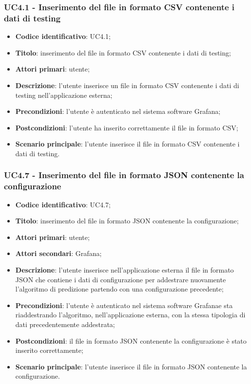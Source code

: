 \subsubsection{UC4.1 - Inserimento del file in formato CSV contenente i dati di testing}
\begin{itemize}
    \item \textbf{Codice identificativo}: UC4.1;
    \item \textbf{Titolo}: inserimento del file in formato CSV contenente i dati di testing;
    \item \textbf{Attori primari}: utente;
    \item \textbf{Descrizione}: l'utente inserisce un file in formato CSV contenente i dati di testing nell'applicazione esterna;
    \item \textbf{Precondizioni}: l'utente è autenticato nel sistema software Grafana\glo;
    \item \textbf{Postcondizioni}: l'utente ha inserito correttamente il file in formato CSV;
    \item \textbf{Scenario principale}: l'utente inserisce il file in formato CSV contenente i dati di testing.
\end{itemize}
\subsubsection{UC4.7 - Inserimento del file in formato JSON contenente la configurazione}
\begin{itemize}
	\item \textbf{Codice identificativo}: UC4.7;
	\item \textbf{Titolo}: inserimento del file in formato JSON contenente la configurazione;
	\item \textbf{Attori primari}: utente;
	\item \textbf{Attori secondari}: Grafana\glo;
	\item \textbf{Descrizione}: l'utente inserisce nell'applicazione esterna il file in formato JSON che contiene i dati di configurazione per addestrare nuovamente l'algoritmo di predizione partendo con una configurazione precedente;
	\item \textbf{Precondizioni}: l'utente è autenticato nel sistema software Grafana\glosp e sta riaddestrando l'algoritmo, nell'applicazione esterna, con la stessa tipologia di dati precedentemente addestrata;
	\item \textbf{Postcondizioni}: il file in formato JSON contenente la configurazione è stato inserito correttamente;
	\item \textbf{Scenario principale}: l'utente inserisce il file in formato JSON contenente la configurazione.
\end{itemize}
